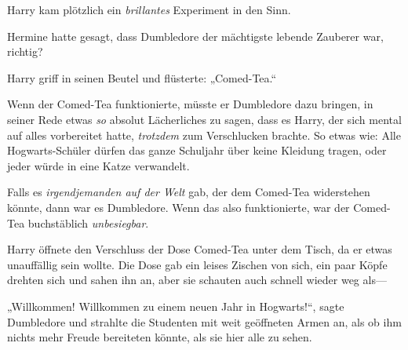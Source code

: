 Harry kam plötzlich ein \emph{brillantes} Experiment in den Sinn.

Hermine hatte gesagt, dass Dumbledore der mächtigste lebende Zauberer war, richtig?

Harry griff in seinen Beutel und flüsterte: „Comed-Tea.“

Wenn der Comed-Tea funktionierte, müsste er Dumbledore dazu bringen, in seiner Rede etwas \emph{so} absolut Lächerliches zu sagen, dass es Harry, der sich mental auf alles vorbereitet hatte, \emph{trotzdem} zum Verschlucken brachte. So etwas wie: Alle Hogwarts-Schüler dürfen das ganze Schuljahr über keine Kleidung tragen, oder jeder würde in eine Katze verwandelt.

Falls es \emph{irgendjemanden auf der Welt} gab, der dem Comed-Tea widerstehen könnte, dann war es Dumbledore. Wenn das also funktionierte, war der Comed-Tea buchstäblich \emph{unbesiegbar}.

Harry öffnete den Verschluss der Dose Comed-Tea unter dem Tisch, da er etwas unauffällig sein wollte. Die Dose gab ein leises Zischen von sich, ein paar Köpfe drehten sich und sahen ihn an, aber sie schauten auch schnell wieder weg als—

„Willkommen! Willkommen zu einem neuen Jahr in Hogwarts!“, sagte Dumbledore und strahlte die Studenten mit weit geöffneten Armen an, als ob ihm nichts mehr Freude bereiteten könnte, als sie hier alle zu sehen.

